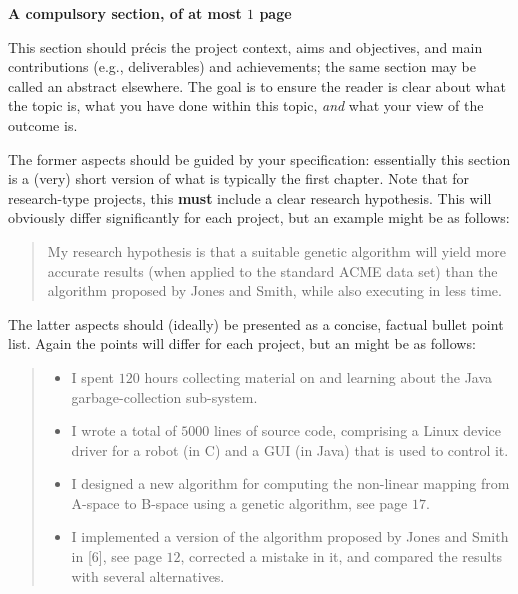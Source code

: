 \documentclass[ %
                    author={Manan Vaswani},
                supervisor={Dr. Raphael Clifford},
                    degree={MEng},
                     title={A multi-core CPU implementation \n of the classical Boson Sampling algorithm},
                  subtitle={},
                      type={},
                      year={2019} ]{dissertation}
\begin{document}
{\bf A compulsory section, of at most $1$ page} 
\vspace{1cm} 

\noindent
This section should pr\'{e}cis the project context, aims and objectives,
and main contributions (e.g., deliverables) and achievements; the same 
section may be called an abstract elsewhere.  The goal is to ensure the 
reader is clear about what the topic is, what you have done within this 
topic, {\em and} what your view of the outcome is.

The former aspects should be guided by your specification: essentially 
this section is a (very) short version of what is typically the first 
chapter.  Note that for research-type projects, this {\bf must} include 
a clear research hypothesis.  This will obviously differ significantly
for each project, but an example might be as follows:

\begin{quote}
My research hypothesis is that a suitable genetic algorithm will yield
more accurate results (when applied to the standard ACME data set) than 
the algorithm proposed by Jones and Smith, while also executing in less
time.
\end{quote}

\noindent
The latter aspects should (ideally) be presented as a concise, factual 
bullet point list.  Again the points will differ for each project, but 
an might be as follows:

\begin{quote}
\noindent
\begin{itemize}
\item I spent $120$ hours collecting material on and learning about the 
      Java garbage-collection sub-system. 
\item I wrote a total of $5000$ lines of source code, comprising a Linux 
      device driver for a robot (in C) and a GUI (in Java) that is 
      used to control it.
\item I designed a new algorithm for computing the non-linear mapping 
      from A-space to B-space using a genetic algorithm, see page $17$.
\item I implemented a version of the algorithm proposed by Jones and 
      Smith in [6], see page $12$, corrected a mistake in it, and 
      compared the results with several alternatives.
\end{itemize}
\end{quote}


\end{document}
